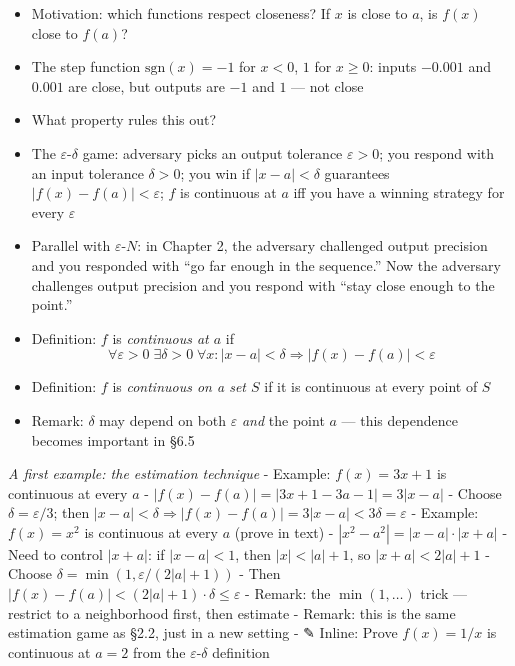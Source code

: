 \documentclass[
  10pt,
  letterpaper,
]{scrbook}
\providecommand{\tightlist}{%
  \setlength{\itemsep}{0pt}\setlength{\parskip}{0pt}}
\begin{document}
\begin{itemize}
\tightlist
\item
  Motivation: which functions respect closeness? If \(x\) is close to
  \(a\), is \(f(x)\) close to \(f(a)\)?
\item
  The step function \(\text{sgn}(x) = -1\) for \(x < 0\), \(1\) for
  \(x \geq 0\): inputs \(-0.001\) and \(0.001\) are close, but outputs
  are \(-1\) and \(1\) --- not close
\item
  What property rules this out?
\item
  The \(\varepsilon\)-\(\delta\) game: adversary picks an output
  tolerance \(\varepsilon > 0\); you respond with an input tolerance
  \(\delta > 0\); you win if \(|x - a| < \delta\) guarantees
  \(|f(x) - f(a)| < \varepsilon\); \(f\) is continuous at \(a\) iff you
  have a winning strategy for every \(\varepsilon\)
\item
  Parallel with \(\varepsilon\)-\(N\): in Chapter 2, the adversary
  challenged output precision and you responded with ``go far enough in
  the sequence.'' Now the adversary challenges output precision and you
  respond with ``stay close enough to the point.''
\item
  Definition: \(f\) is \emph{continuous at \(a\)} if
  \[\forall \varepsilon > 0 \; \exists \delta > 0 \; \forall x: |x - a| < \delta \Rightarrow |f(x) - f(a)| < \varepsilon\]
\item
  Definition: \(f\) is \emph{continuous on a set \(S\)} if it is
  continuous at every point of \(S\)
\item
  Remark: \(\delta\) may depend on both \(\varepsilon\) \emph{and} the
  point \(a\) --- this dependence becomes important in §6.5
\end{itemize}

\emph{A first example: the estimation technique} - Example:
\(f(x) = 3x + 1\) is continuous at every \(a\) -
\(|f(x) - f(a)| = |3x + 1 - 3a - 1| = 3|x - a|\) - Choose
\(\delta = \varepsilon/3\); then
\(|x - a| < \delta \Rightarrow |f(x) - f(a)| = 3|x - a| < 3\delta = \varepsilon\)
- Example: \(f(x) = x^2\) is continuous at every \(a\) (prove in text) -
\(|x^2 - a^2| = |x - a| \cdot |x + a|\) - Need to control \(|x + a|\):
if \(|x - a| < 1\), then \(|x| < |a| + 1\), so \(|x + a| < 2|a| + 1\) -
Choose \(\delta = \min(1, \varepsilon/(2|a|+1))\) - Then
\(|f(x) - f(a)| < (2|a|+1) \cdot \delta \leq \varepsilon\) - Remark: the
\(\min(1, \ldots)\) trick --- restrict to a neighborhood first, then
estimate - Remark: this is the same estimation game as §2.2, just in a
new setting - ✎ Inline: Prove \(f(x) = 1/x\) is continuous at \(a = 2\)
from the \(\varepsilon\)-\(\delta\) definition
\end{document}
